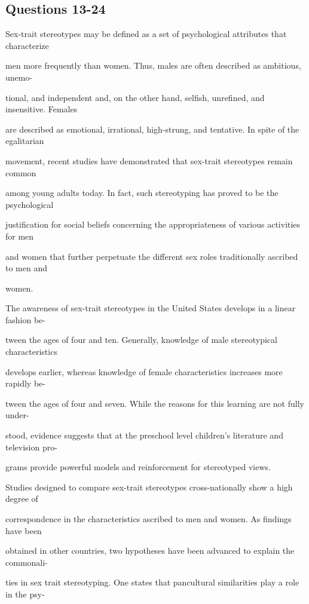 \documentclass[12pt]{article}
\begin{document}
\subsection*{Questions 13-24}
\begingroup
\small
\sloppy
\setlength{\parskip}{0pt}
\setlength{\parindent}{0pt}
Sex-trait stereotypes may be defined as a set of psychological attributes that characterize\par
men more frequently than women. Thus, males are often described as ambitious, unemo-\par
tional, and independent and, on the other hand, selfish, unrefined, and insensitive. Females\par
are described as emotional, irrational, high-strung, and tentative. In spite of the egalitarian\par
movement, recent studies have demonstrated that sex-trait stereotypes remain common\par
among young adults today. In fact, such stereotyping has proved to be the psychological\par
justification for social beliefs concerning the appropriateness of various activities for men\par
and women that further perpetuate the different sex roles traditionally ascribed to men and\par
women.\par
The awareness of sex-trait stereotypes in the United States develops in a linear fashion be-\par
tween the ages of four and ten. Generally, knowledge of male stereotypical characteristics\par
develops earlier, whereas knowledge of female characteristics increases more rapidly be-\par
tween the ages of four and seven. While the reasons for this learning are not fully under-\par
stood, evidence suggests that at the preschool level children's literature and television pro-\par
grams provide powerful models and reinforcement for stereotyped views.\par
Studies designed to compare sex-trait stereotypes cross-nationally show a high degree of\par
correspondence in the characteristics ascribed to men and women. As findings have been\par
obtained in other countries, two hypotheses have been advanced to explain the commonali-\par
ties in sex trait stereotyping. One states that pancultural similarities play a role in the psy-\par
\end{document}
